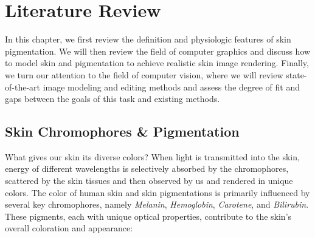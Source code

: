 
\chapter{Literature Review}
\begin{spacing}{1.5}
\setlength{\parskip}{0.3in}

In this chapter, we first review the definition and physiologic features of skin pigmentation. We will then review the field of computer graphics and discuss how to model skin and pigmentation to achieve realistic skin image rendering. Finally, we turn our attention to the field of computer vision, where we will review state-of-the-art image modeling and editing methods and assess the degree of fit and gaps between the goals of this task and existing methods.
\section{Skin Chromophores \& Pigmentation}

What gives our skin its diverse colors? When light is transmitted into the skin, energy of different wavelengths is selectively absorbed by the chromophores, scattered by the skin tissues and then observed by us and rendered in unique colors. The color of human skin and skin pigmentations is primarily influenced by several key chromophores, namely \textit{Melanin}, \textit{Hemoglobin}, \textit{Carotene}, and \textit{Bilirubin}. These pigments, each with unique optical properties, contribute to the skin's overall coloration and appearance:


\end{spacing}
